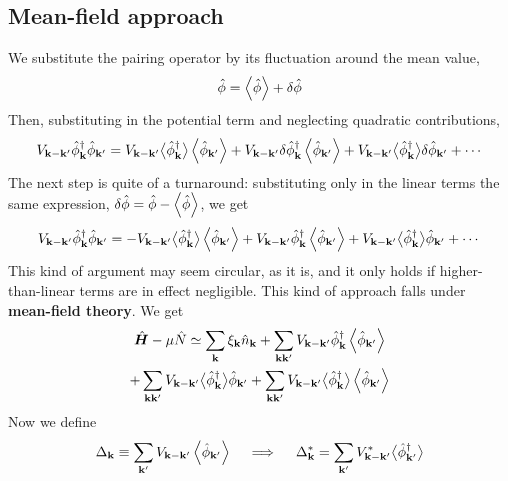 \subsection{Mean-field approach}
We substitute the pairing operator by its fluctuation around the mean value,
\[
	\hat{\phi} = \ev{\hat{\phi}} + \delta\hat{\phi}
\]
Then, substituting in the potential term and neglecting quadratic contributions,
\[
	V_{\mathbf{k}-\mathbf{k}'} \hat{\phi}_\mathbf{k}^\dagger \hat{\phi}_{\mathbf{k}'} = V_{\mathbf{k}-\mathbf{k}'}  \big\langle\hat{\phi}_\mathbf{k}^\dagger\big\rangle \ev{\hat{\phi}_{\mathbf{k}'}}
	+ V_{\mathbf{k}-\mathbf{k}'} \delta\hat{\phi}_\mathbf{k}^\dagger \ev{\hat{\phi}_{\mathbf{k}'}}
	+ V_{\mathbf{k}-\mathbf{k}'} \big\langle\hat{\phi}_\mathbf{k}^\dagger\big\rangle \delta\hat{\phi}_{\mathbf{k}'}
	+ \cdots
\]
The next step is quite of a turnaround: substituting only in the linear terms the same expression, $\delta\hat{\phi} = \hat{\phi}-\ev{\hat{\phi}}$, we get
\[
	V_{\mathbf{k}-\mathbf{k}'} \hat{\phi}_\mathbf{k}^\dagger \hat{\phi}_{\mathbf{k}'} = - V_{\mathbf{k}-\mathbf{k}'}  \big\langle\hat{\phi}_\mathbf{k}^\dagger\big\rangle \ev{\hat{\phi}_{\mathbf{k}'}}
	+ V_{\mathbf{k}-\mathbf{k}'} \hat{\phi}_\mathbf{k}^\dagger \ev{\hat{\phi}_{\mathbf{k}'}}
	+ V_{\mathbf{k}-\mathbf{k}'} \big\langle\hat{\phi}_\mathbf{k}^\dagger\big\rangle\hat{\phi}_{\mathbf{k}'}
	+ \cdots
\]
This kind of argument may seem circular, as it is, and it only holds if higher-than-linear terms are in effect negligible. This kind of approach falls under \textbf{mean-field theory}. We get
\begin{multline*}
	\hat{\bm H} - \mu\hat{N} \simeq \sum_{\mathbf{k}} \xi_{\mathbf{k}} \hat n_\mathbf{k} + 
	\sum_{\mathbf{k}\mathbf{k}'} V_{\mathbf{k}-\mathbf{k}'} \hat{\phi}_\mathbf{k}^\dagger \ev{\hat{\phi}_{\mathbf{k}'}} \\ + \sum_{\mathbf{k}\mathbf{k}'} V_{\mathbf{k}-\mathbf{k}'}  \big\langle\hat{\phi}_\mathbf{k}^\dagger \big\rangle \hat{\phi}_{\mathbf{k}'} + \sum_{\mathbf{k}\mathbf{k}'} V_{\mathbf{k}-\mathbf{k}'}  \big\langle\hat{\phi}_\mathbf{k}^\dagger \big\rangle \ev{\hat{\phi}_{\mathbf{k}'}}
\end{multline*}
Now we define
\begin{equation}\label{eq:delta mean field definition}
	\Delta_\mathbf{k} \equiv \sum_{\mathbf{k}'} V_{\mathbf{k}-\mathbf{k}'} \ev{\hat{\phi}_{\mathbf{k}'}}
	\quad\implies\quad
	\Delta_\mathbf{k}^* = \sum_{\mathbf{k}'} V_{\mathbf{k}-\mathbf{k}'}^* \big\langle\hat{\phi}_{\mathbf{k}'}^\dagger\big\rangle
\end{equation}
